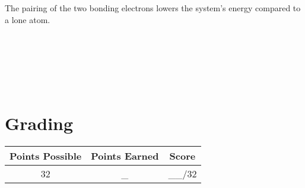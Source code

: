 \documentclass[10pt, letterpaper]{article}
\begin{document}
The pairing of the two bonding electrons lowers the system's energy compared to a lone atom.




\\
\;
\\

\hline

\\
\;
\\

\section*{Grading}

\begin{center}
	\begin{tabular}{|c|c||c|}
		\hline
		\textbf{Points Possible} & \textbf{Points Earned} & \textbf{Score} \\
		\hline
		32 & _ & __/32 \\
		\hline
	\end{tabular}
\end{center}
\end{document}
